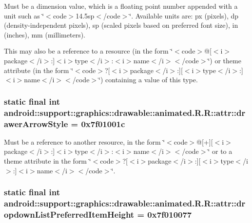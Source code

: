 Must be a dimension value, which is a floating point number appended with a unit such as \char`\"{}$<$code$>$14.5sp$<$/code$>$\char`\"{}. Available units are: px (pixels), dp (density-independent pixels), sp (scaled pixels based on preferred font size), in (inches), mm (millimeters). 

This may also be a reference to a resource (in the form \char`\"{}$<$code$>$@\mbox{[}$<$i$>$package$<$/i$>$:\mbox{]}$<$i$>$type$<$/i$>$:$<$i$>$name$<$/i$>$$<$/code$>$\char`\"{}) or theme attribute (in the form \char`\"{}$<$code$>$?\mbox{[}$<$i$>$package$<$/i$>$:\mbox{]}\mbox{[}$<$i$>$type$<$/i$>$:\mbox{]}$<$i$>$name$<$/i$>$$<$/code$>$\char`\"{}) containing a value of this type. \hypertarget{classandroid_1_1support_1_1graphics_1_1drawable_1_1animated_1_1_r_1_1attr_f503ade04230b52dfea5e741d932d4ef}{
\subsubsection[{drawerArrowStyle}]{\setlength{\rightskip}{0pt plus 5cm}static final int android::support::graphics::drawable::animated.R.R::attr::drawerArrowStyle = 0x7f01001c}}
\label{classandroid_1_1support_1_1graphics_1_1drawable_1_1animated_1_1_r_1_1attr_f503ade04230b52dfea5e741d932d4ef}


Must be a reference to another resource, in the form \char`\"{}$<$code$>$@\mbox{[}+\mbox{]}\mbox{[}$<$i$>$package$<$/i$>$:\mbox{]}$<$i$>$type$<$/i$>$:$<$i$>$name$<$/i$>$$<$/code$>$\char`\"{} or to a theme attribute in the form \char`\"{}$<$code$>$?\mbox{[}$<$i$>$package$<$/i$>$:\mbox{]}\mbox{[}$<$i$>$type$<$/i$>$:\mbox{]}$<$i$>$name$<$/i$>$$<$/code$>$\char`\"{}. \hypertarget{classandroid_1_1support_1_1graphics_1_1drawable_1_1animated_1_1_r_1_1attr_fa61e1d9855564c8fee1b5a1908f1e3b}{
\subsubsection[{dropdownListPreferredItemHeight}]{\setlength{\rightskip}{0pt plus 5cm}static final int android::support::graphics::drawable::animated.R.R::attr::dropdownListPreferredItemHeight = 0x7f010077}}
\label{classandroid_1_1support_1_1graphics_1_1drawable_1_1animated_1_1_r_1_1attr_fa61e1d9855564c8fee1b5a1908f1e3b}


